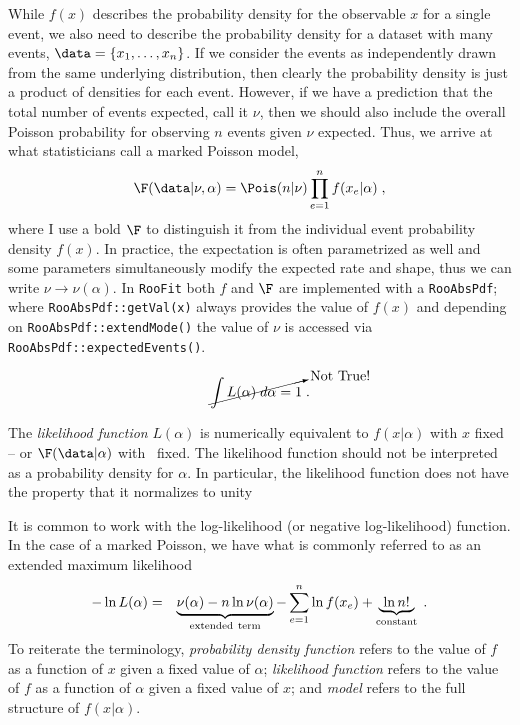 While $f(x)$ describes the probability density for the observable $x$ for a single event, we also need to describe the probability density for a dataset with many events, $\data = \{x_1,\dots,x_{n}\}$.  If we consider the events as independently drawn from the same underlying distribution, then clearly the probability density is just a product of densities for each event.  However, if we have  a prediction that the total number of events expected, call it $\nu$, then we should also include the overall Poisson probability for observing $n$ events given $\nu$ expected.  Thus, we arrive at what statisticians call a marked Poisson model,
\begin{equation}\label{Eq:markedPoisson}
\F(\data|\nu,\alpha) = \Pois(n|\nu) \prod_{e=1}^n f(x_e|\alpha) \; ,
\end{equation}
where I use a bold $\F$ to distinguish it from the individual event probability density $f(x)$.  In practice, the expectation is often parametrized as well and some parameters simultaneously modify the expected rate and shape, thus we can write $\nu\rightarrow\nu(\alpha)$.  In \texttt{RooFit} both $f$ and $\F$ are implemented with a \texttt{RooAbsPdf}; where \texttt{RooAbsPdf::getVal(x)} always provides the value of $f(x)$ and depending on \texttt{RooAbsPdf::extendMode()} the value of $\nu$ is accessed via \texttt{RooAbsPdf::expectedEvents()}.


\begin{equation}
\cancelto{\mathrm{Not ~True!}}{\int L(\alpha) \;d\alpha = 1}\; .
\end{equation}


The \emph{likelihood function} $L(\alpha)$ is numerically equivalent to $f(x|\alpha)$ with $x$ fixed -- or $\F(\data|\alpha)$ with \data\ fixed.  The likelihood function should not be interpreted as a probability density for $\alpha$.  In particular, the likelihood function does not have the property that it normalizes to unity


It is common to work with the log-likelihood (or negative log-likelihood) function.  In the case of a marked Poisson, we have what is commonly referred to as an extended maximum likelihood~\cite{Barlow1990496}
\begin{eqnarray}
-\ln L( \alpha) &=& \underbrace{\nu(\alpha) - n \ln \nu(\alpha)}_{\rm extended~term} - \sum_{e=1}^n \ln f(x_e)   + \underbrace{~\ln n! ~}_{\mathrm{constant}}\; .
\end{eqnarray}
To reiterate the terminology, \emph{probability density function} refers to the value of $f$ as a function of $x$ given a fixed value of $\alpha$; \emph{likelihood function} refers to the value of $f$ as a function of $\alpha$ given a fixed value of $x$; and \emph{model} refers to the full structure of $f(x|\alpha)$.


